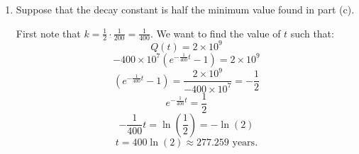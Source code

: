 \documentclass[nooutcomes]{ximera}
\begin{document}
\begin{problem}
\begin{enumerate}
	\item  Suppose that the decay constant is half the minimum value found in part (c).

		\begin{freeResponse}
		First note that $k = \frac{1}{2} \cdot \frac{1}{200} = \frac{1}{400}$.
		We want to find the value of $t$ such that:
			\begin{equation*}
			Q(t) = 2 \times 10^9
			\end{equation*}
			\begin{equation*}
			- 400 \times 10^7 \left(e^{-\frac{1}{400}t}-1 \right) = 2 \times 10^9
			\end{equation*}
			\begin{equation*}
			\left(e^{-\frac{1}{400}t}-1 \right) = \frac{2 \times 10^9}{-400 \times 10^7} = - \frac{1}{2}
			\end{equation*}
			\begin{equation*}
			e^{-\frac{1}{400}t} = \frac{1}{2}
			\end{equation*}
			\begin{equation*}
			-\frac{1}{400}t=\ln \left(\frac{1}{2} \right) = -\ln(2)
			\end{equation*}
			\begin{equation*}
			t = 400 \ln(2) \approx 277.259 \text{ years}.
			\end{equation*}
		\end{freeResponse}
	\end{enumerate}
\end{problem}
\end{document}
